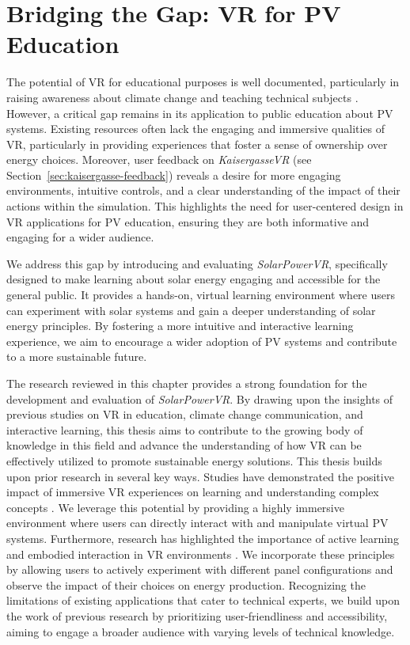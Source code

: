 \documentclass[draft, final]{vutinfth} %
\begin{document}
\section{Bridging the Gap: VR for PV Education}

The potential of VR for educational purposes is well documented, particularly in raising awareness about climate change and teaching technical subjects \cite{HuAu2018VrExperience, Merchant2014VrEffectiveness, Queiroz2023Efficacy, McEvoy2023Climate}. However, a critical gap remains in its application to public education about PV systems. Existing resources often lack the engaging and immersive qualities of VR, particularly in providing experiences that foster a sense of ownership over energy choices. 
Moreover, user feedback on \textit{KaisergasseVR} (see Section~\ref{sec:kaisergasse-feedback}) reveals a desire for more engaging environments, intuitive controls, and a clear understanding of the impact of their actions within the simulation. This highlights the need for user-centered design in VR applications for PV education, ensuring they are both informative and engaging for a wider audience.

We address this gap by introducing and evaluating \textit{SolarPowerVR}, specifically designed to make learning about solar energy engaging and accessible for the general public. It provides a hands-on, virtual learning environment where users can experiment with solar systems and gain a deeper understanding of solar energy principles. By fostering a more intuitive and interactive learning experience, we aim to encourage a wider adoption of PV systems and contribute to a more sustainable future.

The research reviewed in this chapter provides a strong foundation for the development and evaluation of \textit{SolarPowerVR}. By drawing upon the insights of previous studies on VR in education, climate change communication, and interactive learning, this thesis aims to contribute to the growing body of knowledge in this field and advance the understanding of how VR can be effectively utilized to promote sustainable energy solutions. This thesis builds upon prior research in several key ways. Studies have demonstrated the positive impact of immersive VR experiences on learning and understanding complex concepts \cite{Winn2002Immersion, Bailenson2008Transformations}. We leverage this potential by providing a highly immersive environment where users can directly interact with and manipulate virtual PV systems. Furthermore, research has highlighted the importance of active learning and embodied interaction in VR environments \cite{Queiroz2023Efficacy}. We incorporate these principles by allowing users to actively experiment with different panel configurations and observe the impact of their choices on energy production. Recognizing the limitations of existing applications that cater to technical experts, we build upon the work of previous research \cite{HuAu2018VrExperience} by prioritizing user-friendliness and accessibility, aiming to engage a broader audience with varying levels of technical knowledge.
\end{document}
